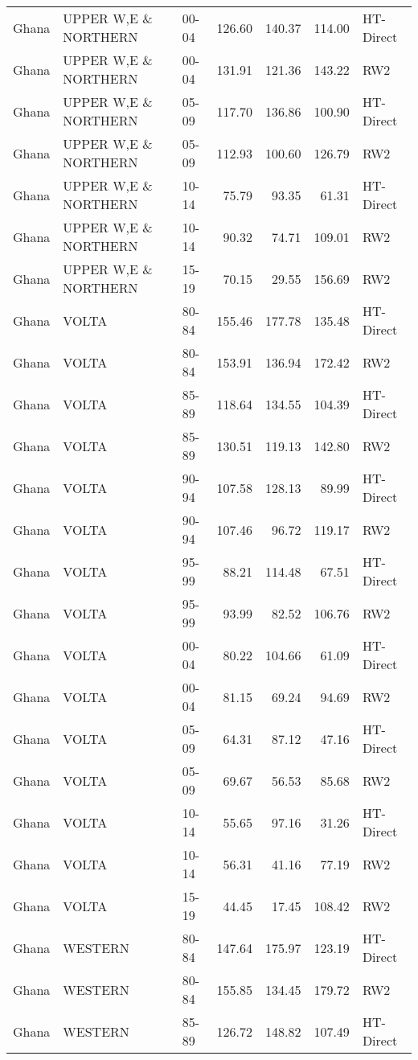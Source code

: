 \begin{longtable}{lllrrrl}
  Ghana & UPPER W,E \& NORTHERN & 00-04 & 126.60 & 140.37 & 114.00 & HT-Direct \\ 
  Ghana & UPPER W,E \& NORTHERN & 00-04 & 131.91 & 121.36 & 143.22 & RW2 \\ 
  Ghana & UPPER W,E \& NORTHERN & 05-09 & 117.70 & 136.86 & 100.90 & HT-Direct \\ 
  Ghana & UPPER W,E \& NORTHERN & 05-09 & 112.93 & 100.60 & 126.79 & RW2 \\ 
  Ghana & UPPER W,E \& NORTHERN & 10-14 & 75.79 & 93.35 & 61.31 & HT-Direct \\ 
  Ghana & UPPER W,E \& NORTHERN & 10-14 & 90.32 & 74.71 & 109.01 & RW2 \\ 
  Ghana & UPPER W,E \& NORTHERN & 15-19 & 70.15 & 29.55 & 156.69 & RW2 \\ 
  Ghana & VOLTA & 80-84 & 155.46 & 177.78 & 135.48 & HT-Direct \\ 
  Ghana & VOLTA & 80-84 & 153.91 & 136.94 & 172.42 & RW2 \\ 
  Ghana & VOLTA & 85-89 & 118.64 & 134.55 & 104.39 & HT-Direct \\ 
  Ghana & VOLTA & 85-89 & 130.51 & 119.13 & 142.80 & RW2 \\ 
  Ghana & VOLTA & 90-94 & 107.58 & 128.13 & 89.99 & HT-Direct \\ 
  Ghana & VOLTA & 90-94 & 107.46 & 96.72 & 119.17 & RW2 \\ 
  Ghana & VOLTA & 95-99 & 88.21 & 114.48 & 67.51 & HT-Direct \\ 
  Ghana & VOLTA & 95-99 & 93.99 & 82.52 & 106.76 & RW2 \\ 
  Ghana & VOLTA & 00-04 & 80.22 & 104.66 & 61.09 & HT-Direct \\ 
  Ghana & VOLTA & 00-04 & 81.15 & 69.24 & 94.69 & RW2 \\ 
  Ghana & VOLTA & 05-09 & 64.31 & 87.12 & 47.16 & HT-Direct \\ 
  Ghana & VOLTA & 05-09 & 69.67 & 56.53 & 85.68 & RW2 \\ 
  Ghana & VOLTA & 10-14 & 55.65 & 97.16 & 31.26 & HT-Direct \\ 
  Ghana & VOLTA & 10-14 & 56.31 & 41.16 & 77.19 & RW2 \\ 
  Ghana & VOLTA & 15-19 & 44.45 & 17.45 & 108.42 & RW2 \\ 
  Ghana & WESTERN & 80-84 & 147.64 & 175.97 & 123.19 & HT-Direct \\ 
  Ghana & WESTERN & 80-84 & 155.85 & 134.45 & 179.72 & RW2 \\ 
  Ghana & WESTERN & 85-89 & 126.72 & 148.82 & 107.49 & HT-Direct \\ 

\end{longtable}
